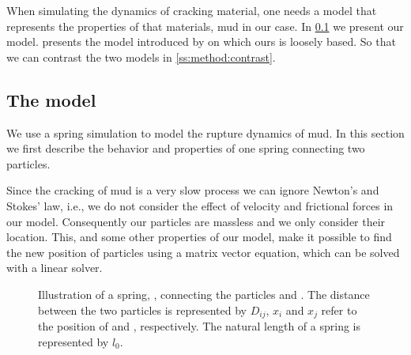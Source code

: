 
When simulating the dynamics of cracking material, one needs a model that represents the properties of that materials, mud in our case. In \cref{ss:method:model} we present our model.  presents the model introduced by \citeauthor{vogel2005studies2} on which ours is loosely based. So that we can contrast the two models in \cref{ss:method:contrast}.

\subsection{The model}\label{ss:method:model}
We use a spring simulation to model the rupture dynamics of mud. In this section we first describe the behavior and properties of one spring connecting two particles. 

Since the cracking of mud is a very slow process we can ignore Newton's and Stokes' law, i.e., we do not consider the effect of velocity and frictional forces in our model. Consequently our particles are massless and we only consider their location. This, and some other properties of our model, make it possible to find the new position of particles using a matrix vector equation, which can be solved with a linear solver.

\begin{figure}
	\centering
	\caption{Illustration of a spring, , connecting the particles  and . The distance between the two particles is represented by $D_{ij}$, $x_i$ and $x_j$ refer to the position of  and , respectively. The natural length of a spring is represented by $l_0$.}
	\label{fig:method:spring}
\end{figure}


